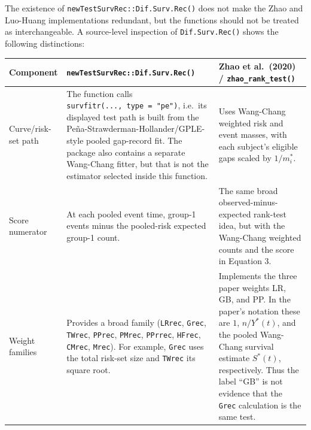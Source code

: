 \documentclass[
  12pt]{article}
\newcounter{none} %
\begin{document}
The existence of \texttt{newTestSurvRec::Dif.Surv.Rec()} does not make
the Zhao and Luo-Huang implementations redundant, but the functions
should not be treated as interchangeable. A source-level inspection of
\texttt{Dif.Surv.Rec()} shows the following distinctions:

{\def\LTcaptype{none} %
\begin{longtable}[]{@{}
  >{\raggedright\arraybackslash}p{}
  >{\raggedright\arraybackslash}p{}
  >{\raggedright\arraybackslash}p{}@{}}
\toprule\noalign{}
\begin{minipage}[b]{\linewidth}\raggedright
Component
\end{minipage} & \begin{minipage}[b]{\linewidth}\raggedright
\texttt{newTestSurvRec::Dif.Surv.Rec()}
\end{minipage} & \begin{minipage}[b]{\linewidth}\raggedright
Zhao et al.~(2020) / \texttt{zhao\_rank\_test()}
\end{minipage} \\
\midrule\noalign{}
\endhead
\bottomrule\noalign{}
\endlastfoot
Curve/risk-set path & The function calls
\texttt{survfitr(...,\ type\ =\ "pe")}, i.e.~its displayed test path is
built from the Peña-Strawderman-Hollander/GPLE-style pooled gap-record
fit. The package also contains a separate Wang-Chang fitter, but that is
not the estimator selected inside this function. & Uses Wang-Chang
weighted risk and event masses, with each subject's eligible gaps scaled
by \(1/m_i^*\). \\
Score numerator & At each pooled event time, group-1 events minus the
pooled-risk expected group-1 count. & The same broad
observed-minus-expected rank-test idea, but with the Wang-Chang weighted
counts and the score in Equation 3. \\
Weight families & Provides a broad family (\texttt{LRrec},
\texttt{Grec}, \texttt{TWrec}, \texttt{PPrec}, \texttt{PMrec},
\texttt{PPrrec}, \texttt{HFrec}, \texttt{CMrec}, \texttt{Mrec}). For
example, \texttt{Grec} uses the total risk-set size and \texttt{TWrec}
its square root. & Implements the three paper weights LR, GB, and PP. In
the paper's notation these are \(1\), \(n/Y^*(t)\), and the pooled
Wang-Chang survival estimate \(S^*(t)\), respectively. Thus the label
``GB'' is not evidence that the \texttt{Grec} calculation is the same
test. \\

\end{longtable}}
\end{document}

